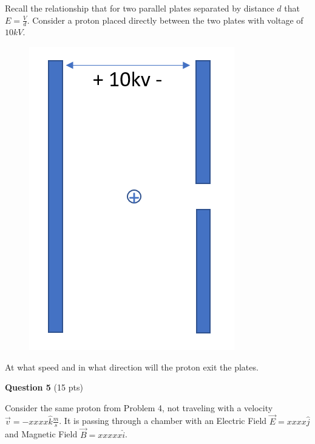 \documentclass[14pt]{report}
\begin{document}
Recall the relationship that for two parallel plates separated by distance $d$ that $E = \frac{V}{d}$. Consider a proton placed directly between the two plates with voltage of $10 kV$. 

\begin{figure}[H]
\begin{center}
\includegraphics[scale=0.25]{final_4a.png}
\end{center}
\end{figure}

At what speed and in what direction will the proton exit the plates. 

\textbf{Question 5} (15 pts)

Consider the same proton from Problem 4, not traveling with a velocity $\vec{v} = -xxxx \hat{k}  \frac{m}{s}$. It is passing through a chamber with an Electric Field $\vec{E} = xxxx \hat{j}$ and Magnetic Field $\vec{B} = xxxxx \hat{i}$.
\end{document}

